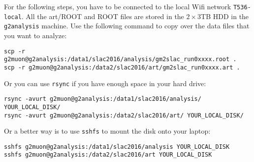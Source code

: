 For the following steps, you have to be connected to the local Wifi network \verb+T536-local+.
All the art/ROOT and ROOT files are stored in the $2\times3$TB HDD in the \verb+g2analysis+ machine.
Use the following command to copy over the data files that you want to analyze: 
%
\begin{lstlisting}[frame=single, basicstyle=\ttfamily\footnotesize]
scp -r g2muon@g2analysis:/data1/slac2016/analysis/gm2slac_run0xxxx.root . 
scp -r g2muon@g2analysis:/data2/slac2016/art/gm2slac_run0xxxx.art .
\end{lstlisting}
%
Or you can use \verb+rsync+ if you have enough space in your hard drive:
%
\begin{lstlisting}[frame=single, basicstyle=\ttfamily\footnotesize]
rsync -avurt g2muon@g2analysis:/data1/slac2016/analysis/ YOUR_LOCAL_DISK/
rsync -avurt g2muon@g2analysis:/data2/slac2016/art/ YOUR_LOCAL_DISK/
\end{lstlisting}
%
Or a better way is to use \verb+sshfs+ to mount the disk onto your laptop:
\begin{lstlisting}[frame=single, basicstyle=\ttfamily\footnotesize]
sshfs g2muon@g2analysis:/data1/slac2016/analysis YOUR_LOCAL_DISK
sshfs g2muon@g2analysis:/data2/slac2016/art YOUR_LOCAL_DISK
\end{lstlisting}
